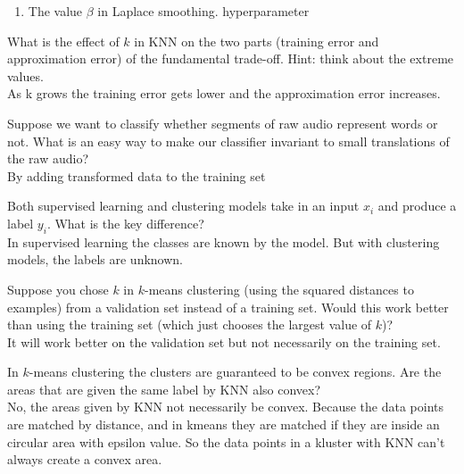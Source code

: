 \documentclass{article}
\def\ans#1{{\color{ans}#1}}
\begin{document}
{\begin{enumerate}
\item The value $\beta$ in Laplace smoothing. \ans{hyperparameter}
\end{enumerate}
\item What is the effect of $k$ in KNN on the two parts (training error and approximation error) of the fundamental trade-off. Hint: think about the extreme values. \\
\ans{
   As k grows the training error gets lower and the approximation error increases.
}
\item Suppose we want to classify whether segments of raw audio represent words or not. What is an easy way to make our classifier invariant to small translations of the raw audio? \\
\ans{
   By adding transformed data to the training set
}
\item Both supervised learning and clustering models take in an input $x_i$ and produce a label $y_i$. What is the key difference? \\
\ans{
   In supervised learning the classes are known by the model. But with clustering models, the labels are unknown.
}
\item Suppose you chose $k$ in $k$-means clustering (using the squared distances to examples) from a validation set instead of a training set. Would this work better than using the training set (which just chooses the largest value of $k$)? \\
\ans{
   It will work better on the validation set but not necessarily on the training set.
}
\item In $k$-means clustering the clusters are guaranteed to be convex regions. Are the areas that are given the same label by KNN also convex? \\
\ans{
   No, the areas given by KNN not necessarily be convex. Because the data points are matched by distance,
   and in kmeans they are matched if they are inside an circular area with epsilon value. So the 
   data points in a kluster with KNN can't always create a convex area.
}
}
\end{document}
